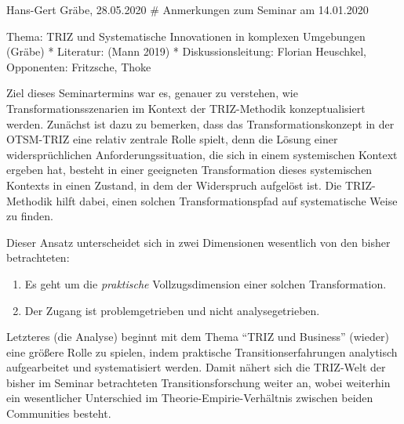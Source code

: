 \documentclass[11pt,a4paper]{article}
\begin{document}
Hans-Gert Gräbe, 28.05.2020 \# Anmerkungen zum Seminar am 14.01.2020

Thema: TRIZ und Systematische Innovationen in komplexen Umgebungen
(Gräbe) * Literatur: (Mann 2019) * Diskussionsleitung: Florian
Heuschkel, Opponenten: Fritzsche, Thoke

Ziel dieses Seminartermins war es, genauer zu verstehen, wie
Transformationsszenarien im Kontext der TRIZ-Methodik konzeptualisiert
werden. Zunächst ist dazu zu bemerken, dass das Transformationskonzept
in der OTSM-TRIZ eine relativ zentrale Rolle spielt, denn die Lösung
einer widersprüchlichen Anforderungssituation, die sich in einem
systemischen Kontext ergeben hat, besteht in einer geeigneten
Transformation dieses systemischen Kontexts in einen Zustand, in dem der
Widerspruch aufgelöst ist. Die TRIZ-Methodik hilft dabei, einen solchen
Transformationspfad auf systematische Weise zu finden.

Dieser Ansatz unterscheidet sich in zwei Dimensionen wesentlich von den
bisher betrachteten:

\begin{enumerate}
[noitemsep]
\item
  Es geht um die \emph{praktische} Vollzugsdimension einer solchen
  Transformation.
\item
  Der Zugang ist problemgetrieben und nicht analysegetrieben.
\end{enumerate}

Letzteres (die Analyse) beginnt mit dem Thema ``TRIZ und Business''
(wieder) eine größere Rolle zu spielen, indem praktische
Transitionserfahrungen analytisch aufgearbeitet und systematisiert
werden. Damit nähert sich die TRIZ-Welt der bisher im Seminar
betrachteten Transitionsforschung weiter an, wobei weiterhin ein
wesentlicher Unterschied im Theorie-Empirie-Verhältnis zwischen beiden
Communities besteht.
\end{document}
